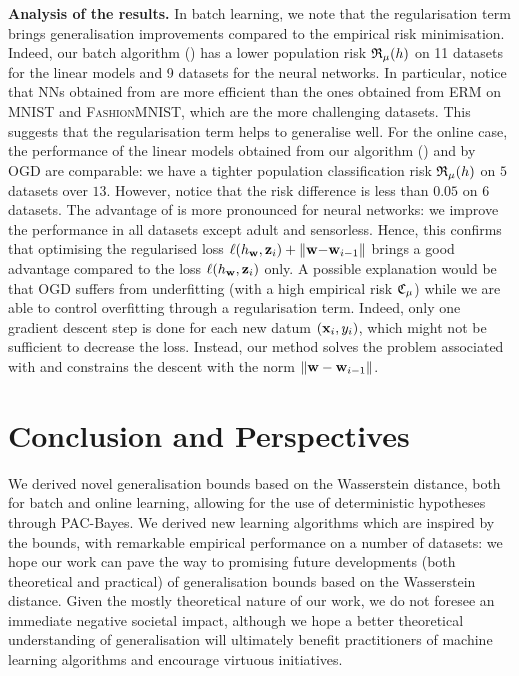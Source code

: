 \documentclass{article}
\begin{document}
\textbf{Analysis of the results.} In batch learning, we note that the regularisation term brings generalisation improvements compared to the empirical risk minimisation.
Indeed, our batch algorithm () has a lower population risk $\mathfrak{R}_{\mu}(h)$ on 11 datasets for the linear models and 9 datasets for the neural networks. In particular, notice that NNs obtained from  are more efficient than the ones obtained from ERM on \textsc{MNIST} and \textsc{FashionMNIST}, which are the more challenging datasets.
This suggests that the regularisation term helps to generalise well.
For the online case, the performance of the linear models obtained from our algorithm () and by OGD are comparable: we have a tighter population classification risk $\mathfrak{R}_{\mu}(h)$ on $5$ datasets over $13$. 
However, notice that the risk difference is less than $0.05$ on $6$ datasets.
The advantage of  is more pronounced for neural networks: we improve the performance in all datasets except {\sc adult} and {\sc sensorless}.
Hence, this confirms that optimising the regularised loss $\ell(h_{\mathbf{w}}, \mathbf{z}_i) + \|\mathbf{w}{-}\mathbf{w}_{i-1}\|$ brings a good advantage compared to the loss $\ell(h_{\mathbf{w}}, \mathbf{z}_i)$ only. A possible explanation would be that OGD suffers from underfitting (with a high empirical risk $\mathfrak{C}_{\mu}$) while we are able to control overfitting through a regularisation term.
Indeed, only one gradient descent step is done for each new datum $(\mathbf{x}_i, y_i)$, which might not be sufficient to decrease the loss. 
Instead, our method solves the problem associated with  and constrains the descent with the norm $\|\mathbf{w}-\mathbf{w}_{i-1}\|$.

\section{Conclusion and Perspectives}

We derived novel generalisation bounds based on the Wasserstein distance, both for batch and online learning, allowing for the use of deterministic hypotheses through PAC-Bayes.
We derived new learning algorithms which are inspired by the bounds, with remarkable empirical performance on a number of datasets: we hope our work can pave the way to promising future developments (both theoretical and practical) of generalisation bounds based on the Wasserstein distance.
Given the mostly theoretical nature of our work, we do not foresee an immediate negative societal impact, although we hope a better theoretical understanding of generalisation will ultimately benefit practitioners of machine learning algorithms and encourage virtuous initiatives.
\end{document}
